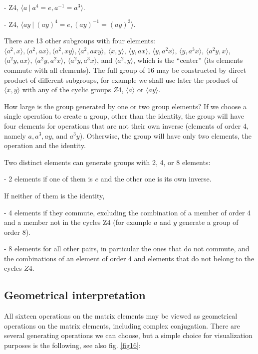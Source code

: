 {- Z4, $\langle a \ | \ a^{4}=e, a^{-1}=a^{3}\rangle$.

- Z4, $\langle ay \ | \ (ay)^{4}=e, (ay)^{-1}=(ay)^{3}\rangle$.

There are 13 other subgroups
with four elements: $\langle a^{2}, x\rangle, \langle a^{2}, ax\rangle, \langle a^{2}, xy\rangle, \langle a^{2}, axy\rangle $, $\langle x, y\rangle$, $\langle y, ax\rangle$, $\langle y, a^{2}x\rangle$, $\langle y, a^{3}x\rangle$, $\langle a^{2}y, x\rangle$, $ \langle a^{2}y, ax\rangle$, $\langle a^{2}y, a^{2}x\rangle$, $\langle a^{2}y, a^{3}x\rangle$, and $\langle a^{2}, y\rangle$, which is the ``center'' (its elements commute with all elements).
The full group of 16 may be constructed by direct product of different subgroups, for example
we shall use later the product of $\langle x,y\rangle$ with any of the cyclic groups $Z4$,
$\langle a\rangle$ or $\langle ay\rangle$.



How large is the group generated by one or two group elements?
If we choose a single operation to create a group, other than the identity, the group will have four elements for operations that are not their own inverse (elements of order 4, namely  $a, a^{3}, ay$, and $a^{3}y$). Otherwise, the group will have only two elements, the operation and the identity.

Two distinct elements can generate groups with  2, 4, or  8 elements:

- 2 elements if one of them is $e$ and the other one is its own inverse.

If neither of them is the identity,

- 4 elements if they commute, excluding the combination of a member of order 4 and a member not in the cycles Z4
(for example $a$ and $y$ generate a group of order 8).

- 8 elements for all other pairs,  in particular the ones that do not commute, and the combinations of an element of order
4 and elements that do not belong to the cycles $Z4$.
%
%
%
\subsection{Geometrical interpretation\label{gi}}
%
%
All sixteen operations on the matrix elements may be viewed as geometrical operations on the
matrix elements, including complex conjugation.
There are several generating operations we can choose, but a simple choice for visualization  purposes is the following, see also fig. \ref{fig16}:

}
